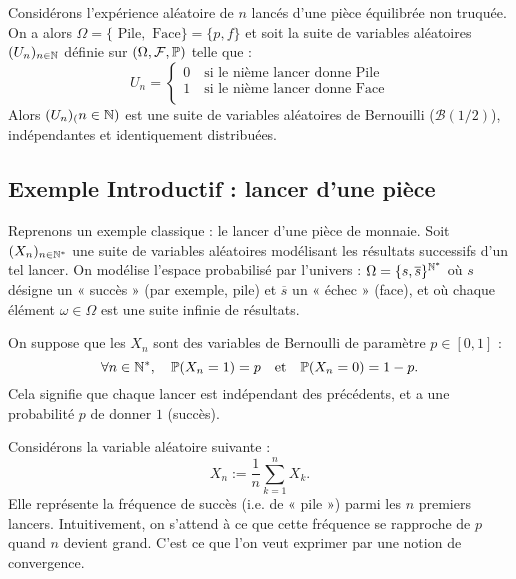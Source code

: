 \begin{example}[Simple]
    Considérons l'expérience aléatoire de $n$ lancés d'une pièce équilibrée non truquée. 
    On a alors $ \Omega = \{\text{ Pile}, \text{ Face}\} = \{p,f\}$ et soit la suite de variables 
    aléatoires $(U_n)_{n \in \mathbb{N}}$ définie sur $(\Omega, \mathcal{F}, \mathbb{P})$ telle que :
        \[ U_n = 
            \begin{cases}
                0 \quad \text{si le nième lancer donne Pile} \\ 
                1 \quad \text{si le nième lancer donne Face} \\ 
            \end{cases}
        \]
    Alors $(U_n)_(n \in \mathbb{N})$ est une suite de variables aléatoires de Bernouilli ($ \mathcal{B}(1/2)$), 
    indépendantes et identiquement distribuées. 
\end{example}


\subsection{Exemple Introductif : lancer d'une pièce}

Reprenons un exemple classique : le lancer d’une pièce de monnaie. Soit $(X_n)_{n \in \mathbb{N}^*}$ une suite 
de variables aléatoires modélisant les résultats successifs d’un tel lancer. On modélise l’espace probabilisé 
par l'univers : $\Omega = \{s, \overline{s}\}^{\mathbb{N}^*} $ où $s$ désigne un « succès » (par exemple, pile) 
et $\overline{s}$ un « échec » (face), et où chaque élément $\omega \in \Omega$ est une suite infinie de 
résultats.

On suppose que les $X_n$ sont des variables de Bernoulli de paramètre $p \in [0,1]$ :
    \[
        \forall n \in \mathbb{N}^*,\quad \mathbb{P}(X_n = 1) = p \quad \text{et} \quad \mathbb{P}(X_n = 0) = 1 - p.
    \]
Cela signifie que chaque lancer est indépendant des précédents, et a une probabilité $p$ de donner $1$ (succès).

\vspace{0.3cm}

Considérons la variable aléatoire suivante :
    \[
        X_n := \frac{1}{n} \sum_{k=1}^n X_k.
    \]
Elle représente la fréquence de succès (i.e. de « pile ») parmi les $n$ premiers lancers.
Intuitivement, on s’attend à ce que cette fréquence se rapproche de $p$ quand $n$ devient grand. 
C’est ce que l’on veut exprimer par une notion de convergence.

\vspace{0.3cm}

